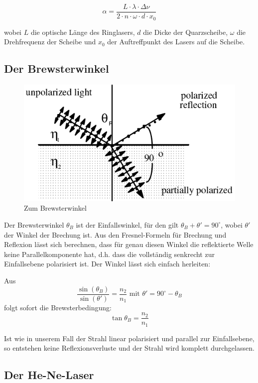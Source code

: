 \begin{equation} \alpha = \frac{L\cdot\lambda\cdot\Delta\nu}{2\cdot n\cdot\omega\cdot d \cdot x_0} \end{equation}

wobei $L$ die optische Länge des Ringlasers, $d$ die Dicke der Quarzscheibe, $\omega$ die Drehfrequenz der Scheibe und $x_0$ der Auftreffpunkt des Lasers auf die Scheibe.

\subsection{Der Brewsterwinkel}

\begin{figure}[H]
	\centering \includegraphics[width = 0.6 \textwidth]{Bilder/brewster.jpg}
	\caption{Zum Brewsterwinkel}
\end{figure}

Der Brewsterwinkel $\theta_B$ ist der Einfallswinkel, für den gilt $\theta_B + \theta' = 90^\circ$, wobei $\theta'$ der Winkel der Brechung ist. Aus den Fresnel-Formeln für Brechung und Reflexion lässt sich berechnen, dass für genau diesen Winkel die reflektierte Welle keine Parallelkomponente hat, d.h. dass die vollständig senkrecht zur Einfallsebene polarisiert ist. Der Winkel lässt sich einfach herleiten:

Aus $$ \frac{\sin(\theta_B)}{\sin(\theta')} = \frac{n_2}{n_1} \text{ \ mit \ } \theta' = 90^\circ - \theta_B$$ folgt sofort die Brewsterbedingung: 
\begin{equation} \tan\theta_B = \frac{n_2}{n_1} \end{equation}

Ist wie in unserem Fall der Strahl linear polarisiert und parallel zur Einfallsebene, so entstehen keine Reflexionsverluste und der Strahl wird komplett durchgelassen.

\subsection{Der He-Ne-Laser}



























